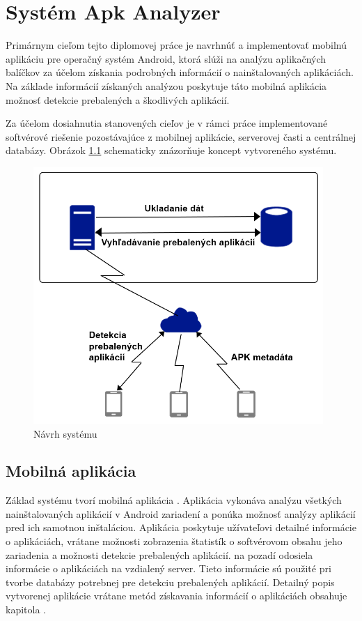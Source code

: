 \chapter{Systém Apk Analyzer}
\label{chap:apk-analyzer}

Primárnym cieľom tejto diplomovej práce je navrhnúť a implementovať mobilnú aplikáciu pre operačný systém Android, ktorá slúži na analýzu aplikačných balíčkov za účelom získania podrobných informácií o nainštalovaných aplikáciách. Na základe informácií získaných analýzou poskytuje táto mobilná aplikácia možnosť detekcie prebalených a škodlivých aplikácií. 

Za účelom dosiahnutia stanovených cieľov je v rámci práce implementované softvérové riešenie pozostávajúce z mobilnej aplikácie, serverovej časti a centrálnej databázy. Obrázok \ref{fig:systémApkAnalyzer} schematicky znázorňuje koncept vytvoreného systému.

\begin{figure}[htb]
  \begin{center}
    \includegraphics[width=110mm]{images/system-overview.png}
  \end{center}
  \caption{Návrh systému }
  \label{fig:systémApkAnalyzer}
\end{figure}

\section{Mobilná aplikácia}
Základ systému tvorí mobilná aplikácia . Aplikácia vykonáva analýzu všetkých nainštalovaných aplikácií v Android zariadení a ponúka možnosť analýzy aplikácií pred ich samotnou inštaláciou. Aplikácia poskytuje užívateľovi detailné informácie o aplikáciách, vrátane možnosti zobrazenia štatistík o softvérovom obsahu jeho zariadenia a možnosti detekcie prebalených aplikácií.  na pozadí odosiela informácie o aplikáciách na vzdialený server. Tieto informácie sú použité pri tvorbe databázy potrebnej pre detekciu prebalených aplikácií. Detailný popis vytvorenej aplikácie vrátane metód získavania informácií o aplikáciách obsahuje kapitola \label{chap:mobilna-aplikacia}.

